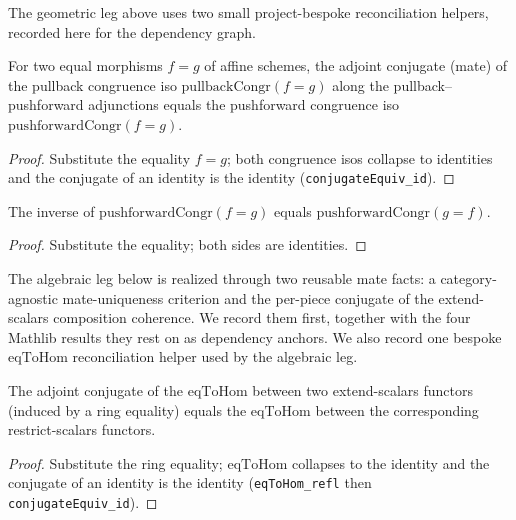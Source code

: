 The geometric leg above uses two small project-bespoke reconciliation helpers, recorded here
for the dependency graph.

\begin{lemma}
  \label{lem:conjugateEquiv_pullbackCongr}
  For two equal morphisms \(f = g\) of affine schemes, the adjoint conjugate (mate) of the pullback
  congruence iso \(\mathrm{pullbackCongr}(f=g)\) along the pullback--pushforward adjunctions equals the
  pushforward congruence iso \(\mathrm{pushforwardCongr}(f=g)\).
  \begin{proof}
    Substitute the equality \(f = g\); both congruence isos collapse to identities and the conjugate of
    an identity is the identity (\texttt{conjugateEquiv\_id}).
  \end{proof}
\end{lemma}

\begin{lemma}
  \label{lem:pushforwardCongr_inv_eq}
  The inverse of \(\mathrm{pushforwardCongr}(f=g)\) equals \(\mathrm{pushforwardCongr}(g=f)\).
  \begin{proof}
    Substitute the equality; both sides are identities.
  \end{proof}
\end{lemma}

The algebraic leg below is realized through two reusable mate facts: a
category-agnostic mate-uniqueness criterion and the per-piece conjugate of the
extend-scalars composition coherence. We record them first, together with the four
Mathlib results they rest on as dependency anchors. We also record one bespoke
\(\mathrm{eqToHom}\) reconciliation helper used by the algebraic leg.

\begin{lemma}
  \label{lem:conjugateEquiv_extendScalars_eqToHom}
  The adjoint conjugate of the \(\mathrm{eqToHom}\) between two extend-scalars functors (induced by a
  ring equality) equals the \(\mathrm{eqToHom}\) between the corresponding restrict-scalars functors.
  \begin{proof}
    Substitute the ring equality; \(\mathrm{eqToHom}\) collapses to the identity and the conjugate of an
    identity is the identity (\texttt{eqToHom\_refl} then \texttt{conjugateEquiv\_id}).
  \end{proof}
\end{lemma}

